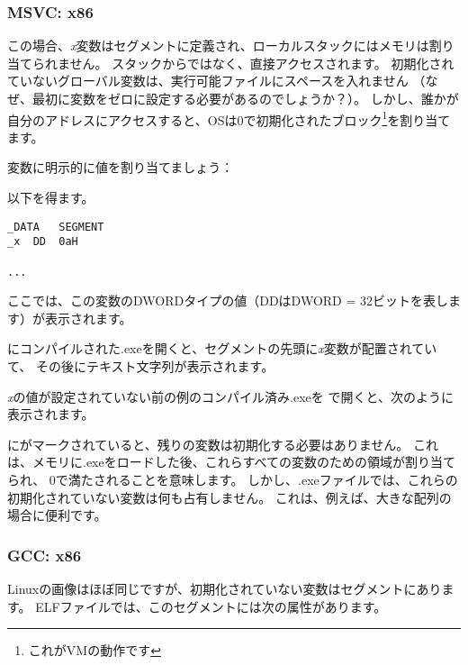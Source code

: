 \subsubsection{MSVC: x86}



この場合、\emph{x}変数はセグメントに定義され、ローカルスタックにはメモリは割り当てられません。 スタックからではなく、直接アクセスされます。 
初期化されていないグローバル変数は、実行可能ファイルにスペースを入れません
（なぜ、最初に変数をゼロに設定する必要があるのでしょうか？）。
しかし、誰かが自分のアドレスにアクセスすると、\ac{OS}は0で初期化されたブロック\footnote{これが\ac{VM}の動作です}を割り当てます。

変数に明示的に値を割り当てましょう：



以下を得ます。

\begin{lstlisting}[style=customasmx86]
_DATA	SEGMENT
_x	DD	0aH

...
\end{lstlisting}

ここでは、この変数のDWORDタイプの値（DDはDWORD = 32ビットを表します）が表示されます。

\IDA にコンパイルされた.exeを開くと、セグメントの先頭に\emph{x}変数が配置されていて、
その後にテキスト文字列が表示されます。

\emph{x}の値が設定されていない前の例のコンパイル済み.exeを \IDA で開くと、次のように表示されます。



にがマークされていると、残りの変数は初期化する必要はありません。 
これは、メモリに.exeをロードした後、これらすべての変数のための領域が割り当てられ、
0で満たされることを意味します。 
しかし、.exeファイルでは、これらの初期化されていない変数は何も占有しません。 
これは、例えば、大きな配列の場合に便利です。



\subsubsection{GCC: x86}

Linuxの画像はほぼ同じですが、初期化されていない変数はセグメントにあります。 
\ac{ELF}ファイルでは、このセグメントには次の属性があります。

